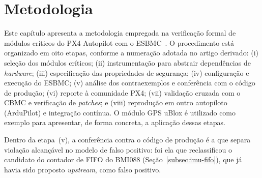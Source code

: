 \chapter{Metodologia}
\label{cap:metodologia}


Este capítulo apresenta a metodologia empregada na verificação formal de módulos críticos do PX4 Autopilot com o ESBMC~\cite{Cordeiro2012}. O procedimento está organizado em oito etapas, conforme a numeração adotada no artigo derivado: (i) seleção dos módulos críticos; (ii) instrumentação para abstrair dependências de \textit{hardware}; (iii) especificação das propriedades de segurança; (iv) configuração e execução do ESBMC; (v) análise dos contraexemplos e conferência com o código de produção; (vi) reporte à comunidade PX4; (vii) validação cruzada com o CBMC e verificação de \textit{patches}; e (viii) reprodução em outro autopiloto (ArduPilot) e integração contínua. O módulo GPS uBlox é utilizado como exemplo para apresentar, de forma concreta, a aplicação dessas etapas.


Dentro da etapa~(v), a
conferência contra o código de produção é a que separa violação alcançável no
modelo de falso positivo: foi ela que reclassificou o candidato do contador de
FIFO do BMI088 (Seção~\ref{subsec:imu-fifo}), que já havia sido proposto
\textit{upstream}, como falso positivo.

